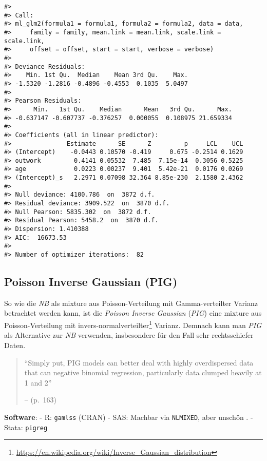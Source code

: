 \documentclass[ngerman,a4paper,]{scrartcl}
\renewcommand{\href}[2]{#2\footnote{\url{#1}}}
\let\rmarkdownfootnote\footnote%
\def\footnote{\protect\rmarkdownfootnote}
\theoremstyle{definition}
\theoremstyle{definition}
\theoremstyle{definition}
\theoremstyle{remark}
\begin{document}
\begin{verbatim}
#> 
#> Call:
#> ml_glm2(formula1 = formula1, formula2 = formula2, data = data, 
#>     family = family, mean.link = mean.link, scale.link = scale.link, 
#>     offset = offset, start = start, verbose = verbose)
#> 
#> Deviance Residuals:
#>    Min. 1st Qu.  Median    Mean 3rd Qu.    Max. 
#> -1.5320 -1.2816 -0.4896 -0.4553  0.1035  5.0497 
#> 
#> Pearson Residuals:
#>      Min.   1st Qu.    Median      Mean   3rd Qu.      Max. 
#> -0.637147 -0.607737 -0.376257  0.000055  0.108975 21.659334 
#> 
#> Coefficients (all in linear predictor):
#>               Estimate      SE      Z         p     LCL    UCL
#> (Intercept)    -0.0443 0.10570 -0.419     0.675 -0.2514 0.1629
#> outwork         0.4141 0.05532  7.485  7.15e-14  0.3056 0.5225
#> age             0.0223 0.00237  9.401  5.42e-21  0.0176 0.0269
#> (Intercept)_s   2.2971 0.07098 32.364 8.85e-230  2.1580 2.4362
#> 
#> Null deviance: 4100.786  on  3872 d.f.
#> Residual deviance: 3909.522  on  3870 d.f.
#> Null Pearson: 5835.302  on  3872 d.f.
#> Residual Pearson: 5458.2  on  3870 d.f.
#> Dispersion: 1.410388
#> AIC:  16673.53
#> 
#> Number of optimizer iterations:  82
\end{verbatim}

\hypertarget{mod-pig}{%
\subsection{Poisson Inverse Gaussian (PIG)}\label{mod-pig}}

So wie die \emph{NB} als mixture aus Poisson-Verteilung mit Gamma-verteilter Varianz betrachtet werden kann, ist die \emph{Poisson Inverse Gaussian} (\emph{PIG}) eine mixture aus Poisson-Verteilung mit \href{https://en.wikipedia.org/wiki/Inverse_Gaussian_distribution}{invers-normalverteilter} Varianz. Demnach kann man \emph{PIG} als Alternative zur \emph{NB} verwenden, insbesondere für den Fall sehr rechtsschiefer Daten.

\begin{quote}
\enquote{Simply put, PIG models can better deal with highly overdispersed data that can negative binomial regression, particularly data clumped heavily at 1 and 2}

-- \citet{hilbeModelingCountData2014} (p.~163)
\end{quote}

\textbf{Software}:
- R: \texttt{gamlss} (CRAN)
- SAS: Machbar via \texttt{NLMIXED}, aber unschön \citep[siehe][]{high2018AlternativeVariance}.
- Stata: \texttt{pigreg}
\end{document}
